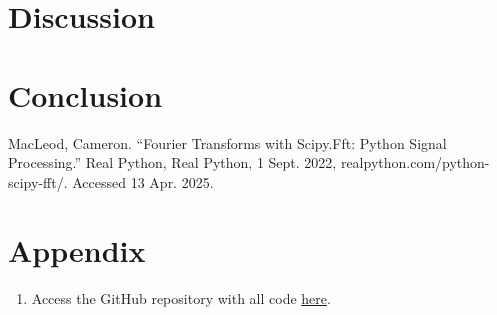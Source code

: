 \documentclass{article}
\begin{document}
\section{Discussion}


\section{Conclusion}

\begin{thebibliography}{9} %
     MacLeod, Cameron. “Fourier Transforms with Scipy.Fft: Python Signal Processing.” Real Python, Real Python, 1 Sept. 2022, realpython.com/python-scipy-fft/. Accessed 13 Apr. 2025. 
\end{thebibliography}

\section{Appendix}
\begin{enumerate}
    \item Access the GitHub repository with all code \href{https://github.com/margheritatonon/approximation-II-assignment}{here}.
\end{enumerate}
\end{document}
